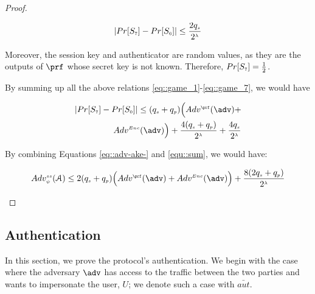 \begin{proof}
\begin{itemize}
\begin{equation}\label{eq::game_7}
|Pr[S_{\scriptscriptstyle  7}]-Pr[S_{\scriptscriptstyle  6}]|\leq \frac{2q_{\scriptscriptstyle  s}}{2^{\scriptscriptstyle \lambda}}
\end{equation}

Moreover, the session key and authenticator are random values, as they are the outputs of $\prf$ whose secret key is not known. Therefore, $Pr[S_{\scriptscriptstyle  7}]=\frac{1}{2}$. 



By summing up all the above relations \ref{eq::game_1}-\ref{eq::game_7}, we would have 

\begin{equation}\label{equ::sum}
\begin{split}
|Pr[S_{\sss  7}]-Pr[S_{\sss  0}]|\leq (q_{\sss s}+q_{\sss p})\Big(Adv^{\sss\prf}(\adv)+\\ Adv^{\sss Enc}(\adv)\Big)+ \frac{4(q_{\sss  s}+q_{\sss  p})}{2^{\sss \lambda}}+\frac{4q_{\sss  s}}{2^{\sss \lambda}}
\end{split}
\end{equation}

By combining Equations \ref{eq::adv-ake-} and \ref{equ::sum}, we would have: 

\begin{equation*} 
Adv_{\sss  \psi}^{\sss  ss}(\A) \leq 2(q_{\sss s}+q_{\sss p})\Big(Adv^{\sss\prf}(\adv)+Adv^{\sss Enc}(\adv)\Big)+\frac{8(2q_{\sss  s}+q_{\sss  p})}{2^{\sss \lambda}}
\end{equation*}

\end{itemize} 
\end{proof}



\subsection{Authentication}

In this section, we prove the protocol's authentication. We begin with the case where the adversary $\adv$ has access to the traffic between the two parties and wants to impersonate the user, $U$; we denote such a case with $\bar {aut}$. 

